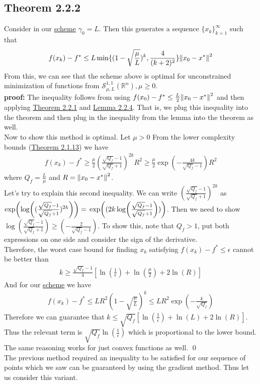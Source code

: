 \documentclass[12pt,a4paper]{article}
\begin{document}
	 \subsection*{Theorem 2.2.2}\label{thm222} Consider in our \hyperref[sec22opt]{scheme} $\gamma_0 = L$. Then this generates a sequence $\{x_k\}_{k=1}^{\infty}$ such that
	 \begin{align*}
	 	f(x_k) - f^* \leq L \min \{(1 - \sqrt{\frac{\mu}{L}})^k, \frac{4}{(k+2)^2}\} \norm{x_0 - x^*}^2
	 \end{align*}
	 From this, we can see that the scheme above is optimal for unconstrained minimization of functions from $\mathcal{S}_{\mu,L}^{1,1}(\mathbb{R}^n), \mu \geq 0$. \\
	 \textbf{proof:} The inequality follows from using $f(x_0) - f^* \leq \frac{L}{2}\norm{x_0 - x^*}^2$ and then applying \hyperref[thm221]{Theorem 2.2.1} and \hyperref[lem224]{Lemma 2.2.4}. That is, we plug this inequality into the theorem and then plug in the inequality from the lemma into the theorem as well. \\
	 Now to show this method is optimal. Let $\mu > 0$ From the lower complexity bounds (\hyperref[thm2113]{Theorem 2.1.13}) we have
	 \begin{align*}
	 	f(x_k) - f^* \geq \frac{\mu}{2}(\frac{\sqrt{Q_f} - 1}{\sqrt{Q_f}+1})^{2k}R^2 \geq \frac{\mu}{2}\exp(- \frac{4k}{\sqrt{Q_f} - 1})R^2
	 \end{align*}
	 where $Q_f = \frac{L}{\mu}$ and $R = \norm{x_0 - x^*}^2$. \\
	 Let's try to explain this second inequality. We can write $(\frac{\sqrt{Q_f} - 1}{\sqrt{Q_f}+1})^{2k}$ as $\exp(\log((\frac{\sqrt{Q_f} - 1}{\sqrt{Q_f}+1})^{2k})) = \\
	 \exp((2k \log(\frac{\sqrt{Q_f} - 1}{\sqrt{Q_f}+1})))$. Then we need to show $\log(\frac{\sqrt{Q_f} - 1}{\sqrt{Q_f}+1}) \geq (- \frac{2}{\sqrt{Q_f} - 1})$. To show this, note that $Q_f > 1$, put both expressions on one side and consider the sign of the derivative. \\
	 Therefore, the worst case bound for finding $x_k$ satisfying $f(x_k) - f^* \leq \epsilon$ cannot be better than 
	 \begin{align*}
	 	k \geq \frac{\sqrt{Q_f} - 1}{4}[\ln(\frac{1}{\epsilon}) + \ln(\frac{\mu}{2}) + 2 \ln(R)]
	 \end{align*}
	 And for our \hyperref[sec22opt]{scheme} we have
	 \begin{align*}
	 	f(x_k) - f^* \leq LR^2(1 - \sqrt{\frac{\mu}{L}})^k \leq LR^2\exp(- \frac{k}{\sqrt{Q_f}})
	 \end{align*}
	 Therefore we can guarantee that $k \leq \sqrt{Q_f}[\ln(\frac{1}{\epsilon}) + \ln(L) + 2 \ln(R)]$. Thus the relevant term is $\sqrt{Q_f}\ln(\frac{1}{\epsilon})$ which is proportional to the lower bound. The same reasoning works for just convex functions as well. \qed \\
	 The previous method required an inequality to be satisfied for our sequence of points which we saw can be guaranteed by using the gradient method. Thus let us consider this variant.
	
\end{document}
